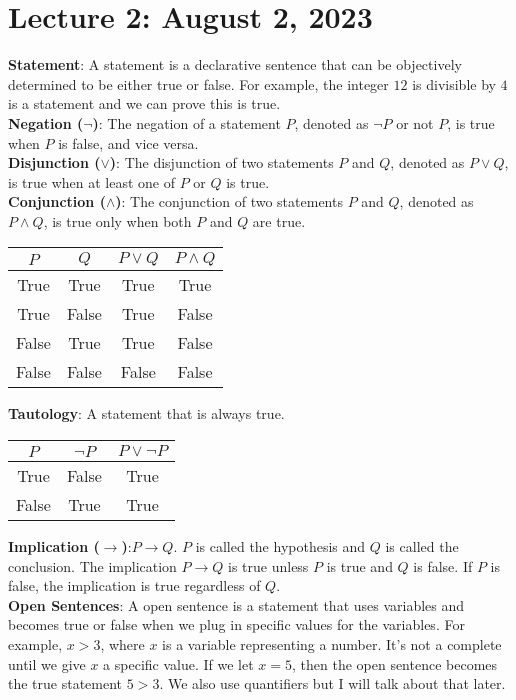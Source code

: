 \documentclass{article}
\begin{document}
\section{Lecture 2: August 2, 2023}
\textbf{Statement}: A statement is a declarative sentence that can be objectively determined to be either true or false. For example, the integer \(12\) is divisible by \(4\) is a statement and we can prove this is true.\\
\textbf{Negation (\(\neg\))}: The negation of a statement \(P\), denoted as \(\neg P\) or not \(P\), is true when \(P\) is false, and vice versa.\\
\textbf{Disjunction (\(\lor\))}: The disjunction of two statements \(P\) and \(Q\), denoted as \(P \lor Q\), is true when at least one of \(P\) or \(Q\) is true.\\
\textbf{Conjunction (\(\land\))}: The conjunction of two statements \(P\) and \(Q\), denoted as \(P \land Q\), is true only when both \(P\) and \(Q\) are true.\\
\begin{center}
\begin{tabular}{|c|c|c|c|}
\hline
\(P\) & \(Q\) & \(P \lor Q\) & \(P \land Q\) \\
\hline
True & True & True & True \\
True & False & True & False \\
False & True & True & False \\
False & False & False & False \\
\hline
\end{tabular}
\end{center}
\textbf{Tautology}: A statement that is always true.
\begin{center}
\begin{tabular}{|c|c|c|}
\hline
\(P\) & \(\neg P\) & \(P \lor \neg P\) \\
\hline
True & False & True \\
False & True & True \\
\hline
\end{tabular}
\end{center}
\textbf{Implication (\(\rightarrow\))}:\(P \rightarrow Q\). \(P\) is called the hypothesis and \(Q\) is called the conclusion. The implication \(P \rightarrow Q\) is true unless \(P\) is true and \(Q\) is false. If \(P\) is false, the implication is true regardless of \(Q\).\\
\textbf{Open Sentences}: A open sentence is a statement that uses variables and becomes true or false when we plug in specific values for the variables. For example,  \(x > 3\), where \(x\) is a variable representing a number. It's not a complete until we give \(x\) a specific value. If we let \(x = 5\), then the open sentence becomes the true statement \(5 > 3\). We also use quantifiers but I will talk about that later.\\
\end{document}
